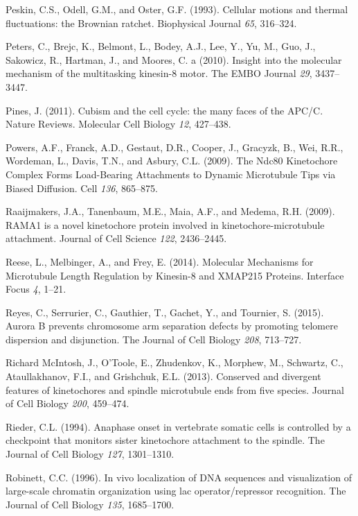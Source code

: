\documentclass[12pt,a4paper,twoside,openright]{book}
\begin{document}
\hypertarget{ref-Peskin1993}{}
Peskin, C.S., Odell, G.M., and Oster, G.F. (1993). Cellular motions and
thermal fluctuations: the Brownian ratchet. Biophysical Journal
\emph{65}, 316--324.

\hypertarget{ref-Peters2010}{}
Peters, C., Brejc, K., Belmont, L., Bodey, A.J., Lee, Y., Yu, M., Guo,
J., Sakowicz, R., Hartman, J., and Moores, C. a (2010). Insight into the
molecular mechanism of the multitasking kinesin-8 motor. The EMBO
Journal \emph{29}, 3437--3447.

\hypertarget{ref-Pines2011}{}
Pines, J. (2011). Cubism and the cell cycle: the many faces of the
APC/C. Nature Reviews. Molecular Cell Biology \emph{12}, 427--438.

\hypertarget{ref-Powers2009a}{}
Powers, A.F., Franck, A.D., Gestaut, D.R., Cooper, J., Gracyzk, B., Wei,
R.R., Wordeman, L., Davis, T.N., and Asbury, C.L. (2009). The Ndc80
Kinetochore Complex Forms Load-Bearing Attachments to Dynamic
Microtubule Tips via Biased Diffusion. Cell \emph{136}, 865--875.

\hypertarget{ref-Raaijmakers2009}{}
Raaijmakers, J.A., Tanenbaum, M.E., Maia, A.F., and Medema, R.H. (2009).
RAMA1 is a novel kinetochore protein involved in kinetochore-microtubule
attachment. Journal of Cell Science \emph{122}, 2436--2445.

\hypertarget{ref-Reese2014a}{}
Reese, L., Melbinger, A., and Frey, E. (2014). Molecular Mechanisms for
Microtubule Length Regulation by Kinesin-8 and XMAP215 Proteins.
Interface Focus \emph{4}, 1--21.

\hypertarget{ref-Reyes2015}{}
Reyes, C., Serrurier, C., Gauthier, T., Gachet, Y., and Tournier, S.
(2015). Aurora B prevents chromosome arm separation defects by promoting
telomere dispersion and disjunction. The Journal of Cell Biology
\emph{208}, 713--727.

\hypertarget{ref-Mcintosh2013}{}
Richard McIntosh, J., O'Toole, E., Zhudenkov, K., Morphew, M., Schwartz,
C., Ataullakhanov, F.I., and Grishchuk, E.L. (2013). Conserved and
divergent features of kinetochores and spindle microtubule ends from
five species. Journal of Cell Biology \emph{200}, 459--474.

\hypertarget{ref-Rieder1994}{}
Rieder, C.L. (1994). Anaphase onset in vertebrate somatic cells is
controlled by a checkpoint that monitors sister kinetochore attachment
to the spindle. The Journal of Cell Biology \emph{127}, 1301--1310.

\hypertarget{ref-Robinett1996}{}
Robinett, C.C. (1996). In vivo localization of DNA sequences and
visualization of large-scale chromatin organization using lac
operator/repressor recognition. The Journal of Cell Biology \emph{135},
1685--1700.
\end{document}
